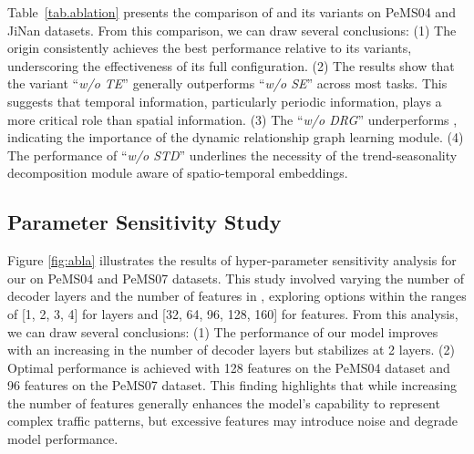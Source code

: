 Table~\ref{tab.ablation} presents the comparison of \model and its variants on PeMS04 and JiNan datasets. From this comparison, we can draw several conclusions: (1) The origin \model consistently achieves the best performance relative to its variants, underscoring the effectiveness of its full configuration. (2) The results show that the variant ``\textit{w/o TE}'' generally outperforms ``\textit{w/o SE}'' across most tasks. This suggests that temporal information, particularly periodic information, plays a more critical role than spatial information. (3) The ``\textit{w/o DRG}'' underperforms \model, indicating the importance of the dynamic relationship graph learning module. (4) The performance of ``\textit{w/o STD}'' underlines the necessity of the trend-seasonality decomposition module aware of spatio-temporal embeddings.
% 
\vspace{-2mm}
\subsection{Parameter Sensitivity Study}

Figure \ref{fig:abla} illustrates the results of hyper-parameter sensitivity analysis for our \model on PeMS04 and PeMS07 datasets. This study involved varying the number of decoder layers and the number of features in \model, exploring options within the ranges of [1, 2, 3, 4] for layers and [32, 64, 96, 128, 160] for features. From this analysis, we can draw several conclusions: (1) The performance of our model improves with an increasing in the number of decoder layers but stabilizes at 2 layers. (2) Optimal performance is achieved with 128 features on the PeMS04 dataset and 96 features on the PeMS07 dataset. This finding highlights that while increasing the number of features generally enhances the model's capability to represent complex traffic patterns, but excessive features may introduce noise and degrade model performance.



